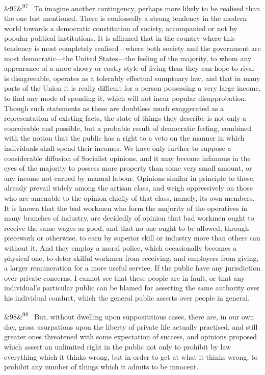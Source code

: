 \documentclass[12pt]{article}
\newcommand{\para}[1][]{\par\noindent\ifx&#1&\else\textsuperscript{\footnotesize #1}~\fi}
\begin{document}
\para[97] To imagine another contingency, perhaps more likely to be realised than the one last mentioned. There is confessedly a strong tendency in the modern world towards a democratic constitution of society, accompanied or not by popular political institutions. It is affirmed that in the country where this tendency is most completely realised---where both society and the government are most democratic---the United States---the feeling of the majority, to whom any appearance of a more showy or costly style of living than they can hope to rival is disagreeable, operates as a tolerably effectual sumptuary law, and that in many parts of the Union it is really difficult for a person possessing a very large income, to find any mode of spending it, which will not incur popular disapprobation. Though such statements as these are doubtless much exaggerated as a representation of existing facts, the state of things they describe is not only a conceivable and possible, but a probable result of democratic feeling, combined with the notion that the public has a right to a veto on the manner in which individuals shall spend their incomes. We have only further to suppose a considerable diffusion of Socialist opinions, and it may become infamous in the eyes of the majority to possess more property than some very small amount, or any income not earned by manual labour. Opinions similar in principle to these, already prevail widely among the artisan class, and weigh oppressively on those who are amenable to the opinion chiefly of that class, namely, its own members. It is known that the bad workmen who form the majority of the operatives in many branches of industry, are decidedly of opinion that bad workmen ought to receive the same wages as good, and that no one ought to be allowed, through piecework or otherwise, to earn by superior skill or industry more than others can without it. And they employ a moral police, which occasionally becomes a physical one, to deter skilful workmen from receiving, and employers from giving, a larger remuneration for a more useful service. If the public have any jurisdiction over private concerns, I cannot see that these people are in fault, or that any individual's particular public can be blamed for asserting the same authority over his individual conduct, which the general public asserts over people in general.

\para[98] But, without dwelling upon supposititious cases, there are, in our own day, gross usurpations upon the liberty of private life actually practised, and still greater ones threatened with some expectation of success, and opinions proposed which assert an unlimited right in the public not only to prohibit by law everything which it thinks wrong, but in order to get at what it thinks wrong, to prohibit any number of things which it admits to be innocent.
\end{document}
